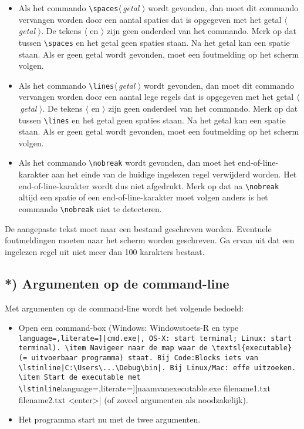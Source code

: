 \documentclass[a4paper,10pt,fleqn,twoside]{article}
\begin{document}
\begin{itemize}
\item Als het commando \lstinline|\spaces|$\langle$\,\textsl{getal} $\rangle$ wordt gevonden, dan moet dit commando vervangen worden door een aantal spaties dat is opgegeven met het getal $\langle$\,\textsl{getal} $\rangle$. De tekens $\langle$ en $\rangle$ zijn geen onderdeel van het commando. Merk op dat tussen \lstinline|\spaces| en het getal geen spaties staan. Na het getal kan een spatie staan. Als er geen getal wordt gevonden, moet een foutmelding op het scherm volgen.
\item Als het commando \lstinline|\lines|$\langle$\,\textsl{getal} $\rangle$ wordt gevonden, dan moet dit commando vervangen worden door een aantal lege regels dat is opgegeven met het getal $\langle$\,\textsl{getal} $\rangle$. De tekens $\langle$ en $\rangle$ zijn geen onderdeel van het commando. Merk op dat tussen \lstinline|\lines| en het getal geen spaties staan. Na het getal kan een spatie staan.  Als er geen getal wordt gevonden, moet een foutmelding op het scherm volgen.
\item Als het commando \lstinline|\nobreak| wordt gevonden, dan moet het end-of-line-karakter aan het einde van de huidige ingelezen regel verwijderd worden. Het end-of-line-karakter wordt dus niet afgedrukt. Merk op dat na \lstinline|\nobreak| altijd een spatie of een end-of-line-karakter moet volgen anders is het commando \lstinline|\nobreak| niet te detecteren.
\end{itemize}

De aangepaste tekst moet naar een bestand geschreven worden. Eventuele foutmeldingen moeten naar het scherm worden geschreven. Ga ervan uit dat een ingelezen regel uit niet meer dan 100 karakters bestaat.


\subsection*{*) Argumenten op de command-line}
Met argumenten op de command-line wordt het volgende bedoeld:

\begin{itemize}
\item Open een command-box (Windows: Windowstoets-R en type \lstinline[language=,literate=]|cmd.exe|, OS-X: start terminal; Linux: start terminal).
\item Navigeer naar de map waar de \textsl{executable} (= uitvoerbaar programma) staat. Bij Code:Blocks iets van \lstinline|C:\Users\...\Debug\bin|. Bij Linux/Mac: effe uitzoeken.
\item Start de executable met \lstinline[language=,literate=]|naamvanexecutable.exe filename1.txt filename2.txt <enter>| (of zoveel argumenten als noodzakelijk).
\item Het programma start nu met de twee argumenten.
\end{itemize}
\end{document}
